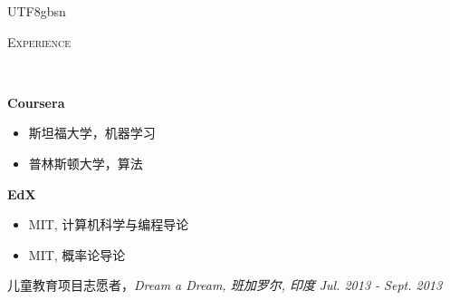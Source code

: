 \documentclass[a4paper]{article}
\newenvironment{changemargin}[2]{%
  \begin{list}{}{%
    \setlength{\topsep}{0pt}%
    \setlength{\leftmargin}{#1}%
    \setlength{\rightmargin}{#2}%
    \setlength{\listparindent}{\parindent}%
    \setlength{\itemindent}{\parindent}%
    \setlength{\parsep}{\parskip}%
  }%
  \item[]}{\end{list}
}
\newcommand{\lineover}{
	\begin{changemargin}{-0.05in}{-0.05in}
		\vspace*{-8pt}
		\hrulefill \\
		\vspace*{-2pt}
	\end{changemargin}
}
\newcommand{\header}[1]{
	\begin{changemargin}{-0.5in}{-0.5in}
		\scshape{#1}\\
  	\lineover
	\end{changemargin}
}
\newenvironment{body} {
	\vspace*{-16pt}
	\begin{changemargin}{-0.25in}{-0.5in}
  }	
	{\end{changemargin}
}
\begin{document}
\begin{CJK*}{UTF8}{gbsn}


\header{Experience}

\begin{body}
	\vspace{14pt}
	\textbf{Coursera}
	\begin{itemize}
	\itemsep 0pt
	\item 斯坦福大学，机器学习
	\item 普林斯顿大学，算法
	\end{itemize}
	\smallskip
	\textbf{EdX}
	\begin{itemize}
	\itemsep 0pt
	\item MIT, 计算机科学与编程导论
	\item MIT, 概率论导论
	\end{itemize}
	\smallskip

	儿童教育项目志愿者，\emph{Dream a Dream, 班加罗尔, 印度} \hfill \emph{Jul. 2013 - Sept. 2013}\\
	\smallskip

\end{body}

\smallskip
\smallskip


\end{CJK*}
\end{document}
